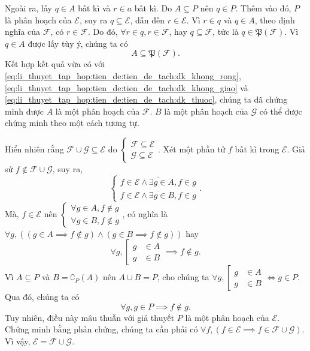 Ngoài ra, lấy $q \in A$ bất kì và $r \in a$ bất kì. Do $A \subseteq P$ nên $q \in P$. Thêm vào đó, $P$ là phân hoạch của $\mathscr{E}$, suy ra $q \subseteq \mathscr{E}$, dẫn đến $r \in \mathscr{E}$. Vì $r \in q$ và $q \in A$, theo định nghĩa của $\mathscr{F}$, có $r \in \mathscr{F}$. Do đó, $\forall r \in q, r \in \mathscr{F}$, hay $q \subseteq \mathscr{F}$, tức là $q \in \mathfrak{P}(\mathscr{F})$. Vì $q \in A$ được lấy tùy ý, chúng ta có
\begin{equation*}
   A \subseteq \mathfrak{P}(\mathscr{F}).
\end{equation*} Kết hợp kết quả vừa có với \eqref{eq:li_thuyet_tap_hop:tien_de:tien_de_tach:dk_khong_rong}, \eqref{eq:li_thuyet_tap_hop:tien_de:tien_de_tach:dk_khong_giao} và \eqref{eq:li_thuyet_tap_hop:tien_de:tien_de_tach:dk_thuoc}, chúng ta đã chứng minh được $A$ là một phân hoạch của $\mathscr{F}$. $B$ là một phân hoạch của $\mathscr{G}$ có thể được chứng minh theo một cách tương tự.

\stepSubexercise Hiển nhiên rằng $\mathscr{F} \cup \mathscr{G} \subseteq \mathscr{E}$ do $\begin{cases}
   \mathscr{F} \subseteq \mathscr{E}\\
   \mathscr{G} \subseteq \mathscr{E}
\end{cases}$. Xét một phần tử $f$ bất kì trong $\mathscr{E}$. Giả sử $f \notin \mathscr{F} \cup \mathscr{G}$, suy ra, 
\begin{equation*}
   \begin{cases}
      \overline{f \in \mathscr{E} \land \exists g \in A, f \in g} \\
      \overline{f \in \mathscr{E} \land \exists g \in B, f \in g} 
   \end{cases}.
\end{equation*}
Mà, $f \in \mathscr{E}$ nên $\begin{cases}
   \forall g \in A, f \notin g \\
   \forall g \in B, f \notin g
\end{cases}$, có nghĩa là $\forall g, \left((g \in A \implies f \notin g) \land (g \in B \implies f \notin g)\right)$ hay $$
   \forall g, \left[\begin{aligned}
      g &\in A \\
      g &\in B
   \end{aligned}\right. \implies f \notin g.
$$ Vì $A \subseteq P$ và $B = \complement_P(A)$ nên $A \cup B = P$, cho chúng ta $\forall g, \left[\begin{aligned}
   g &\in A \\
   g &\in B
\end{aligned}\right. \iff g \in P$. Qua đó, chúng ta có \begin{equation*}
   \forall g, g \in P \implies f \notin g.
\end{equation*}
Tuy nhiên, điều này mâu thuẫn với giả thuyết $P$ là một phân hoạch của $\mathscr{E}$. Chứng minh bằng phản chứng, chúng ta cần phải có $\forall f, (f \in \mathscr{E} \implies f \in \mathscr{F} \cup \mathscr{G})$. Vì vậy, $\mathscr{E} = \mathscr{F} \cup \mathscr{G}$.

